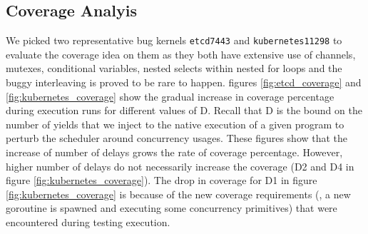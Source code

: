 \subsection{Coverage Analyis}
We picked two representative bug kernels \texttt{etcd7443} and \texttt{kubernetes11298} to evaluate the coverage idea on them as they
%
both have extensive use of channels, mutexes, conditional variables, nested selects within nested for loops and the buggy interleaving is proved to be rare to happen.
%
figures \ref{fig:etcd_coverage} and \ref{fig:kubernetes_coverage} show the gradual increase in coverage percentage during execution runs for different values of D.
%
Recall that D is the bound on the number of yields that we inject to the native execution of a given program to perturb the scheduler around concurrency usages.
%
These figures show that the increase of number of delays grows the rate of coverage percentage.
%
However, higher number of delays do not necessarily increase the coverage (D2 and D4 in figure \ref{fig:kubernetes_coverage}).
%
The drop in coverage for D1 in figure \ref{fig:kubernetes_coverage} is because of the new coverage requirements (\eg, a new goroutine is spawned and executing some concurrency primitives) that were encountered during testing execution.
